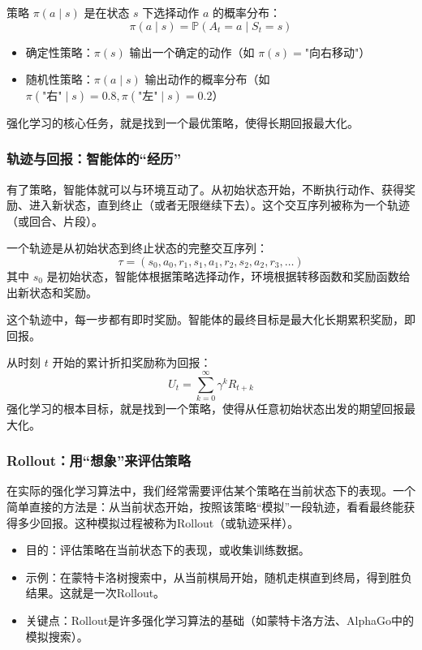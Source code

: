 \documentclass[lang=cn,zihao=-4,a4paper,fontset=windows]{beautybook}
\begin{document}
\begin{definition}[][策略函数]
策略 $\pi(a \mid s)$ 是在状态 $s$ 下选择动作 $a$ 的概率分布：
\[
\pi(a \mid s) = \mathbb{P}(A_t = a \mid S_t = s)
\]
\begin{itemize}
    \item 确定性策略：$\pi(s)$ 输出一个确定的动作（如 $\pi(s) = \text{"向右移动"}$）
    \item 随机性策略：$\pi(a \mid s)$ 输出动作的概率分布（如 $\pi(\text{"右"} \mid s) = 0.8, \pi(\text{"左"} \mid s) = 0.2$）
\end{itemize}
强化学习的核心任务，就是找到一个最优策略，使得长期回报最大化。
\end{definition}

\subsubsection{轨迹与回报：智能体的“经历”}

有了策略，智能体就可以与环境互动了。从初始状态开始，不断执行动作、获得奖励、进入新状态，直到终止（或者无限继续下去）。这个交互序列被称为一个轨迹（或回合、片段）。

\begin{definition}[][轨迹（Trajectory）]
一个轨迹是从初始状态到终止状态的完整交互序列：
\[
\tau = (s_0, a_0, r_1, s_1, a_1, r_2, s_2, a_2, r_3, \ldots)
\]
其中 $s_0$ 是初始状态，智能体根据策略选择动作，环境根据转移函数和奖励函数给出新状态和奖励。
\end{definition}

这个轨迹中，每一步都有即时奖励。智能体的最终目标是最大化长期累积奖励，即回报。

\begin{definition}[][回报（Return）]
从时刻 $t$ 开始的累计折扣奖励称为回报：
\[
U_t = \sum_{k=0}^{\infty} \gamma^k R_{t+k}
\]
强化学习的根本目标，就是找到一个策略，使得从任意初始状态出发的期望回报最大化。
\end{definition}

\subsubsection{Rollout：用“想象”来评估策略}

在实际的强化学习算法中，我们经常需要评估某个策略在当前状态下的表现。一个简单直接的方法是：从当前状态开始，按照该策略“模拟”一段轨迹，看看最终能获得多少回报。这种模拟过程被称为Rollout（或轨迹采样）。

\begin{itemize}
    \item 目的：评估策略在当前状态下的表现，或收集训练数据。
    \item 示例：在蒙特卡洛树搜索中，从当前棋局开始，随机走棋直到终局，得到胜负结果。这就是一次Rollout。
    \item 关键点：Rollout是许多强化学习算法的基础（如蒙特卡洛方法、AlphaGo中的模拟搜索）。
\end{itemize}
\end{document}
